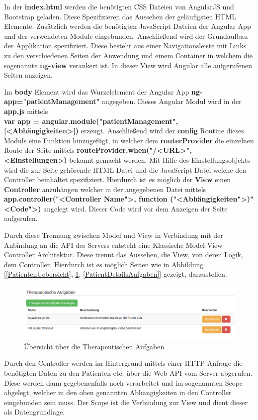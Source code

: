 In der \textbf{index.html} werden die benötigten CSS Dateien von AngularJS und Bootstrap geladen. Diese Spezifizieren das Aussehen der geläufigsten HTML Elemente. Zusätzlich werden die benötigten JavaScript Dateien der Angular App und der verwendeten Module eingebunden. Anschließend wird der Grundaufbau der Applikation spezifiziert. Diese besteht aus einer Navigationsleiste mit Links zu den verschiedenen Seiten der Anwendung und einem Container in welchem die sogenannte \textbf{ng-view} verankert ist.  In dieser View wird Angular alle aufgerufenen Seiten anzeigen.

Im \textbf{body} Element wird das Wurzelelement der Angular App \textbf{ng-app="patientManagement"} angegeben. Dieses Angular Modul wird in der \textbf{app.js} mittels \\ \textbf{var app = angular.module("patientManagement", [<Abhängigkeiten>])} erzeugt. Anschließend wird der \textbf{config} Routine dieses Moduls eine Funktion hinzugefügt, in welcher dem \textbf{routerProvider} die einzelnen Route der Seite mittels \textbf{routeProvider.when("/<URL>", {<Einstellungen>})} bekannt gemacht werden. Mit Hilfe des Einstellungsobjekts wird die zur Seite gehörende HTML Datei und die JavaScript Datei welche den Controller beinhaltet spezifiziert. Hierdurch ist es möglich der \textbf{View} einen \textbf{Controller} anzuhängen welcher in der angegebenen Datei mittels \textbf{app.controller("<Controller Name">, function ("<Abhängigkeiten">){"<Code">})} angelegt wird. Dieser Code wird vor dem Anzeigen der Seite aufgerufen.

Durch diese Trennung zwischen Model und View in Verbindung mit der Anbindung an die API des Servers entsteht eine Klassische Model-View-Controller Architektur. Diese trennt das Aussehen, die View, von deren Logik, dem Controller.
Hierdurch ist es möglich Seiten wie in Abbildung [\ref{PatientenUebersicht}, \ref{AufgabenUebersicht}, \ref{PatientDetailsAufgaben}] gezeigt, darzustellen.

\begin{figure}[H]
	\centering
	\includegraphics[scale=0.4]{images/Screenshots/AufgabenUebersicht}
	\caption[Übersicht über die Therapeutischen Aufgaben]{Übersicht über die Therapeutischen Aufgaben}
	\label{AufgabenUebersicht}
\end{figure}
Durch den Controller werden im Hintergrund mittels einer HTTP Anfrage die benötigten Daten zu den Patienten etc. über die Web-API vom Server abgerufen. Diese werden dann gegebenenfalls noch verarbeitet und im sogenannten Scope abgelegt, welcher in den oben genannten Abhängigkeiten in den Controller eingebunden sein muss.
Der Scope ist die Verbindung zur View und dient dieser als Datengrundlage. 


